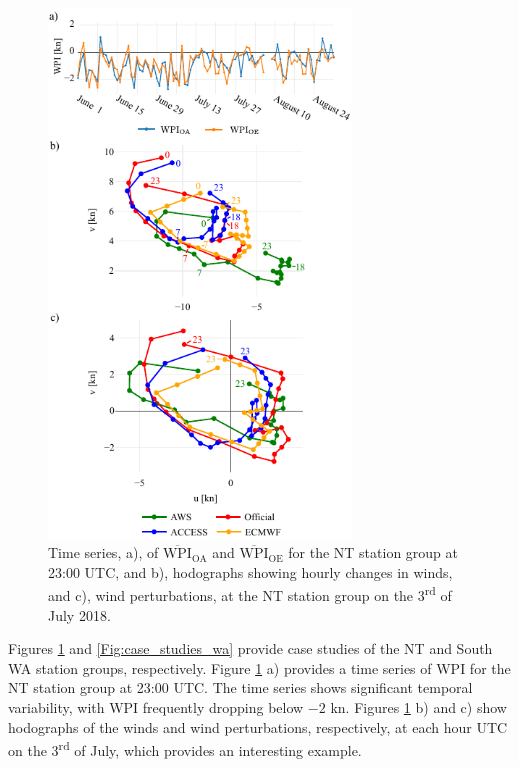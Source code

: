 \documentclass[twocol]{ametsoc}
\begin{document}
\begin{figure}
\centering
\includegraphics[width=19pc]{case_studies_nt.pdf}
\caption{Time series, a), of $\overline{\text{WPI}}_\text{OA}$ and $\overline{\text{WPI}}_\text{OE}$ for the NT station group at 23:00 UTC, and b), hodographs showing hourly changes in winds, and c), wind perturbations, at the NT station group on the 3\textsuperscript{rd} of July 2018.} 
\label{Fig:case_studies_nt}
\end{figure}

Figures \ref{Fig:case_studies_nt} and \ref{Fig:case_studies_wa} provide case studies of the NT and South WA station groups, respectively. Figure \ref{Fig:case_studies_nt} a) provides a time series of WPI for the NT station group at 23:00 UTC. The time series shows significant temporal variability, with WPI frequently dropping below $-2$ kn. Figures \ref{Fig:case_studies_nt} b) and c) show hodographs of the winds and wind perturbations, respectively, at each hour UTC on the 3\textsuperscript{rd} of July, which provides an interesting example. 
\end{document}
